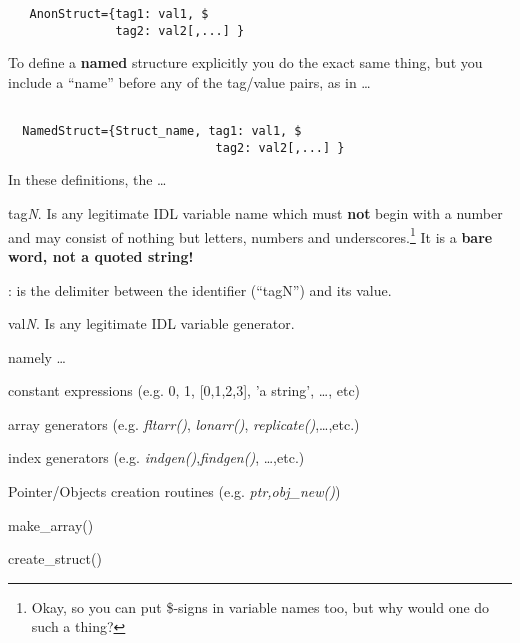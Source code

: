 \begin{IDLExample}
\begin{verbatim}
   AnonStruct={tag1: val1, $
               tag2: val2[,...] }

\end{verbatim}
\end{IDLExample}


To define a \textbf{named} structure explicitly you do the exact same
thing, but you include a ``name'' before any of the tag/value pairs,
as in \ldots 


\begin{IDLExample}
\begin{verbatim}

  NamedStruct={Struct_name, tag1: val1, $
                             tag2: val2[,...] }
\end{verbatim}
\end{IDLExample}

In these definitions, the \ldots

\be

\item tag\textit{N}. Is any legitimate IDL variable name which must
  \textbf{not} begin with a number and may consist of nothing but
  letters, numbers and underscores.\footnote{Okay, so you can put \$-signs in
  variable names too, but why would one do such a thing?}  It is a
  \textbf{bare word, not a quoted string!}

\item : is the delimiter between the identifier (``tagN'') and its value.

\item val\textit{N}. Is any legitimate IDL variable generator.

  namely  \ldots 

  \bi

  \item constant expressions (e.g. 0, 1, [0,1,2,3], 'a string', \ldots, etc)
  \item array generators (e.g. \textit{fltarr()}, \textit{lonarr()}, \textit{replicate()},\ldots,etc.)
  \item index generators (e.g. \textit{indgen()},\textit{findgen()}, \ldots,etc.)
  \item Pointer/Objects creation routines (e.g. \textit{\LB ptr,obj\RB\_new()})
  \item make\_array()
  \item create\_struct()

  \ei

